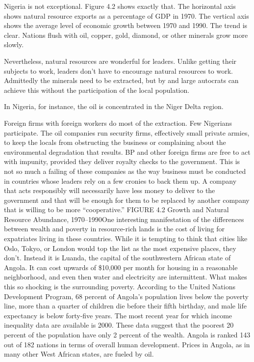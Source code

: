 \documentclass[10pt]{article}
\begin{document}
{\large Nigeria is not exceptional. Figure 4.2 shows exactly that. The
horizontal axis shows natural resource exports as a percentage of GDP in 1970.
The vertical axis shows the average level of economic growth between 1970 and
1990. The trend is clear. Nations flush with oil, copper, gold, diamond, or other
minerals grow more slowly.}

{\large Nevertheless, natural resources are wonderful for leaders. Unlike
getting their subjects to work, leaders don't have to encourage natural resources
to work. Admittedly the minerals need to be extracted, but by and large autocrats
can achieve this without the participation of the local population.}

{\large In Nigeria, for instance, the oil is concentrated in the Niger Delta
region.}

{\large Foreign firms with foreign workers do most of the extraction. Few
Nigerians participate. The oil companies run security firms, effectively small
private armies, to keep the locals from obstructing the business or complaining
about the environmental degradation that results. BP and other foreign firms are
free to act with impunity, provided they deliver royalty checks to the
government. This is not so much a failing of these companies as the way business
must be conducted in countries whose leaders rely on a few cronies to back them
up. A company that acts responsibly will necessarily have less money to deliver
to the government and that will be enough for them to be replaced by another
company that is willing to be more ``cooperative.'' FIGURE 4.2 Growth and Natural
Resource Abundance, 1970--1990One interesting manifestation of the differences
between wealth and poverty in resource-rich lands is the cost of living for
expatriates living in these countries. While it is tempting to think that cities
like Oslo, Tokyo, or London would top the list as the most expensive places, they
don't. Instead it is Luanda, the capital of the southwestern African state of
Angola. It can cost upwards of \$10,000 per month for housing in a reasonable
neighborhood, and even then water and electricity are intermittent. What makes
this so shocking is the surrounding poverty. According to the United Nations
Development Program, 68 percent of Angola's population lives below the poverty
line, more than a quarter of children die before their fifth birthday, and male
life expectancy is below forty-five years. The most recent year for which income
inequality data are available is 2000. These data suggest that the poorest 20
percent of the population have only 2 percent of the wealth. Angola is ranked 143
out of 182 nations in terms of overall human development. Prices in Angola, as in
many other West African states, are fueled by oil.}
\end{document}
